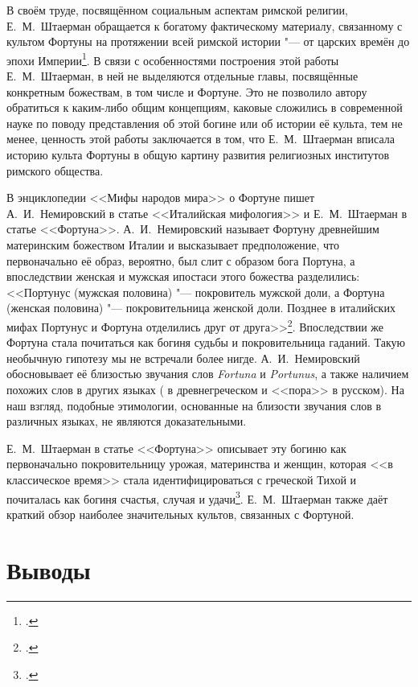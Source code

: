 
В своём труде, посвящённом социальным аспектам римской религии, Е.~М.~Штаерман обращается к богатому фактическому материалу, связанному с культом Фортуны на протяжении всей римской истории "--- от царских времён до эпохи Империи\footcite{Shtaerman1987}. В связи с особенностями построения этой работы Е.~М.~Штаерман, в ней не выделяются отдельные главы, посвящённые конкретным божествам, в том числе и Фортуне. Это не позволило автору обратиться к каким-либо общим концепциям, каковые сложились в современной науке по поводу представления об этой богине или об истории её культа, тем не менее, ценность этой работы заключается в том, что Е.~М.~Штаерман вписала историю культа Фортуны в общую картину развития религиозных институтов римского общества.


В энциклопедии <<Мифы народов мира>> о Фортуне пишет А.~И.~Немировский в статье <<Италийская мифология>> и Е.~М.~Штаерман в статье <<Фортуна>>. А.~И.~Немировский называет Фортуну древнейшим материнским божеством Италии и высказывает предположение, что первоначально её образ, вероятно, был слит с образом бога Портуна, а впоследствии женская и мужская ипостаси этого божества разделились: <<Портунус (мужская половина) "--- покровитель мужской доли, а Фортуна (женская половина) "--- покровительница женской доли. Позднее в италийских мифах Портунус и Фортуна отделились друг от друга>>\footcite[С. 578]{Nemirovsky1987}. Впоследствии же Фортуна стала почитаться как богиня судьбы и покровительница гаданий. Такую необычную гипотезу мы не встречали более нигде. А.~И.~Немировский обосновывает её близостью звучания слов \textit{Fortuna} и \textit{Portunus}, а также наличием похожих слов в других языках ( в древнегреческом и <<пора>> в русском). На наш взгляд, подобные этимологии, основанные на близости звучания слов в различных языках, не являются доказательными.

Е.~М.~Штаерман в статье <<Фортуна>> описывает эту богиню как первоначально покровительницу урожая, материнства и женщин, которая <<в классическое время>> стала идентифицироваться с греческой Тихой и почиталась как богиня счастья, случая и удачи\footcite[С. 571]{Shtaerman1988}. Е.~М.~Штаерман также даёт краткий обзор наиболее значительных культов, связанных с Фортуной.


\section*{Выводы}
{}

